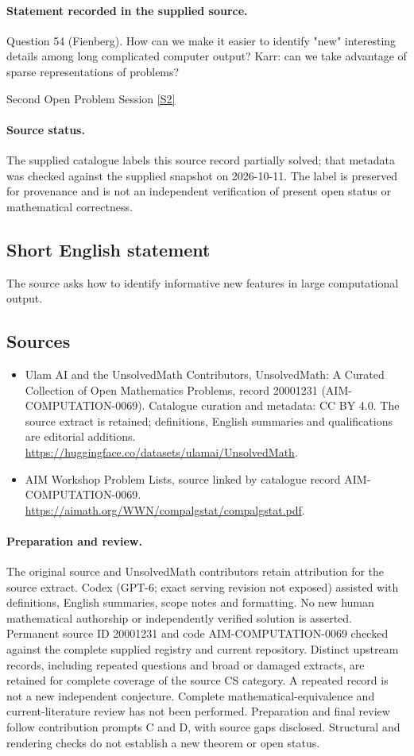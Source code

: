 \documentclass[11pt]{article}
\begin{document}
\paragraph{Statement recorded in the supplied source.}
Question 54 (Fienberg). How can we make it easier to identify "new" interesting details among long complicated computer output? Karr: can we take advantage of sparse representations of problems?

Second Open Problem Session \href{https://aimath.org/WWN/compalgstat/compalgstat.pdf}{[S2]}
\paragraph{Source status.}
The supplied catalogue labels this source record partially solved; that metadata was checked against the supplied snapshot on 2026-10-11. The label is preserved for provenance and is not an independent verification of present open status or mathematical correctness.
\subsection{Short English statement}
The source asks how to identify informative new features in large computational output.
\subsection{Sources}
\begin{itemize}
\item[S1] Ulam AI and the UnsolvedMath Contributors, UnsolvedMath: A Curated Collection of Open Mathematics Problems, record 20001231 (AIM-COMPUTATION-0069). Catalogue curation and metadata: CC BY 4.0. The source extract is retained; definitions, English summaries and qualifications are editorial additions.
\url{https://huggingface.co/datasets/ulamai/UnsolvedMath}.
\item[S2] AIM Workshop Problem Lists, source linked by catalogue record AIM-COMPUTATION-0069.
\url{https://aimath.org/WWN/compalgstat/compalgstat.pdf}.
\end{itemize}
\paragraph{Preparation and review.}
The original source and UnsolvedMath contributors retain attribution for the source extract. Codex (GPT-6; exact serving revision not exposed) assisted with definitions, English summaries, scope notes and formatting. No new human mathematical authorship or independently verified solution is asserted. Permanent source ID 20001231 and code AIM-COMPUTATION-0069 checked against the complete supplied registry and current repository. Distinct upstream records, including repeated questions and broad or damaged extracts, are retained for complete coverage of the source CS category. A repeated record is not a new independent conjecture. Complete mathematical-equivalence and current-literature review has not been performed. Preparation and final review follow contribution prompts C and D, with source gaps disclosed. Structural and rendering checks do not establish a new theorem or open status.
\label{end:20001231}
\end{document}
